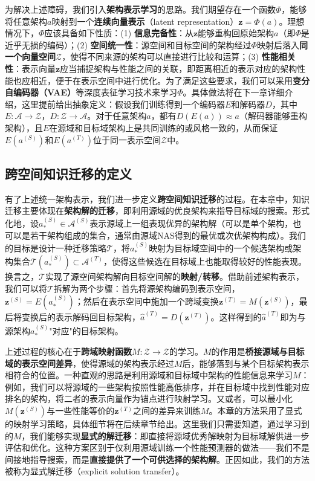 \documentclass[../main.tex]{subfiles}
\begin{document}
为解决上述障碍，我们引入\textbf{架构表示学习}的思路。我们期望存在一个函数$\Phi$，能够将任意架构$a$映射到一个\textbf{连续向量表示}（latent representation）$\mathbf{z} = \Phi(a)$。理想情况下，$\Phi$应该具备如下性质：(1) \textbf{信息完备性}：从$\mathbf{z}$能够重构回原始架构$a$（即$\Phi$是近乎无损的编码）；(2) \textbf{空间统一性}：源空间和目标空间的架构经过$\Phi$映射后落入\textbf{同一个向量空间}$\mathcal{Z}$，使得不同来源的架构可以直接进行比较和运算；(3) \textbf{性能相关性}：表示向量$\mathbf{z}$应当捕捉架构与性能之间的关联，即距离相近的表示对应的架构性能也应相近，便于在表示空间中进行优化。为了满足这些要求，我们可以采用\textbf{变分自编码器（VAE）}等深度表征学习技术来学习$\Phi$。具体做法将在下一章详细介绍，这里提前给出抽象定义：假设我们训练得到一个编码器$E$和解码器$D$，其中$E: \mathcal{A} \to \mathcal{Z}$，$D: \mathcal{Z} \to \mathcal{A}$。对于任意架构$a$，都有$D(E(a)) \approx a$（解码器能够重构架构），且$E$在源域和目标域架构上是共同训练的或风格一致的，从而保证$E(a^{(S)})$和$E(a^{(T)})$位于同一表示空间$\mathcal{Z}$中。

\subsection{跨空间知识迁移的定义}

有了上述统一架构表示，我们进一步定义\textbf{跨空间知识迁移}的过程。在本章中，知识迁移主要体现在\textbf{架构解的迁移}，即利用源域的优良架构来指导目标域的搜索。形式化地，设$a^{(S)}_* \in \mathcal{A}^{(S)}$表示源域上一组表现优异的架构解（可以是单个架构，也可以是若干架构组成的集合，通常由源域NAS得到的最优或次优架构构成）。我们的目标是设计一种迁移策略$\mathcal{T}$，将$a^{(S)}_*$映射为目标域空间中的一个候选架构或架构集合$\mathcal{T}(a^{(S)}_*) \subset \mathcal{A}^{(T)}$，使得这些候选在目标域上也能取得较好的性能表现。换言之，$\mathcal{T}$实现了源空间架构解向目标空间解的\textbf{映射/转移}。借助前述架构表示，我们可以将$\mathcal{T}$拆解为两个步骤：首先将源架构编码到表示空间，$\mathbf{z}^{(S)} = E(a^{(S)}_*)$；然后在表示空间中施加一个跨域变换$\mathbf{z}^{(T)} = M(\mathbf{z}^{(S)})$，最后将变换后的表示解码回目标架构，$\hat{a}^{(T)} = D(\mathbf{z}^{(T)})$。这样得到的$\hat{a}^{(T)}$即为与源架构$a^{(S)}_*$"对应"的目标架构。

上述过程的核心在于\textbf{跨域映射函数}$M: \mathcal{Z} \to \mathcal{Z}$的学习。$M$的作用是\textbf{桥接源域与目标域的表示空间差异}，使得源域的架构表示经过$M$后，能够落到与某个目标架构表示相符合的位置。一种直观的思路是利用源域和目标域中架构的性能信息来学习$M$：例如，我们可以将源域的一些架构按照性能高低排序，并在目标域中找到性能对应排名的架构，将二者的表示向量作为锚点进行映射学习。又或者，可以最小化$M(\mathbf{z}^{(S)})$与一些性能等价的$\mathbf{z}^{(T)}$之间的差异来训练$M$。本章的方法采用了显式的映射学习策略，具体细节将在后续章节给出。这里我们只需要知道，通过学习到的$M$，我们能够实现\textbf{显式的解迁移}：即直接将源域优秀解映射为目标域解供进一步评估和优化。这种方案区别于仅利用源域训练一个性能预测器的做法——我们不是间接地指导搜索，而是\textbf{直接提供了一个可供选择的架构解}。正因如此，我们的方法被称为显式解迁移（explicit solution transfer）。
\end{document}
